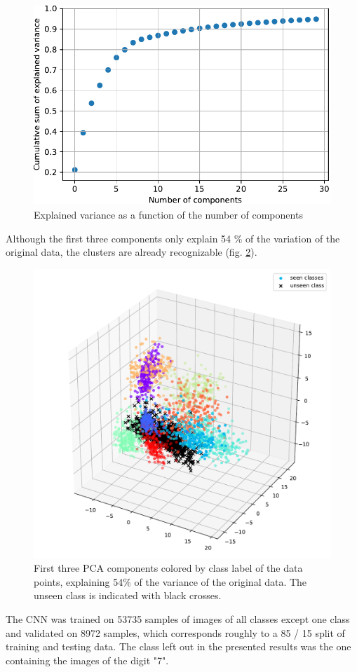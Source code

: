 \documentclass{article}
\begin{document}
\begin{figure}[H]
    \centering
    \includegraphics[width=.5\textwidth]{pca_components}
    \caption{Explained variance as a function of the number of components}
    \label{fig:pca_components}
\end{figure}

Although the first three components only explain 54 \% of the variation of the original data, the clusters are already recognizable (fig. \ref{fig:pca_components_3d}).\\

\begin{figure}[H]
    \centering
    \includegraphics[width=.7\textwidth]{pca_components_3d}
    \caption{First three PCA components colored by class label of the data points, explaining 54\% of the variance of the original data. The unseen class is indicated with black crosses.}
    \label{fig:pca_components_3d}
\end{figure}

The CNN was trained on 53735 samples of images of all classes except one class and validated on 8972 samples, which corresponds roughly to a 85 / 15 split of training and testing data. The class left out in the presented results was the one containing the images of the digit "7".\\
\end{document}
